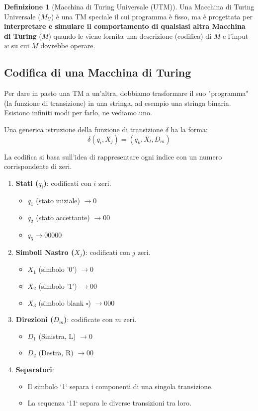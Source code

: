 \documentclass[a4paper]{article}
\theoremstyle{definition} %
\newtheorem{definition}{Definizione}
\newcommand{\blankS}{\ensuremath{\square}}
\theoremstyle{remark} %
\begin{document}
\begin{definition}[Macchina di Turing Universale (UTM)]
Una Macchina di Turing Universale ($M_U$) è una TM speciale il cui programma è fisso, ma è progettata per \textbf{interpretare e simulare il comportamento di qualsiasi altra Macchina di Turing} ($M$) quando le viene fornita una descrizione (codifica) di $M$ e l'input $w$ su cui $M$ dovrebbe operare.
\end{definition}

\subsection{Codifica di una Macchina di Turing}

Per dare in pasto una TM a un'altra, dobbiamo trasformare il suo "programma" (la funzione di transizione) in una stringa, ad esempio una stringa binaria. Esistono infiniti modi per farlo, ne vediamo uno.

Una generica istruzione della funzione di transizione $\delta$ ha la forma:
\[ \delta(q_i, X_j) = (q_k, X_l, D_m) \]

La codifica si basa sull'idea di rappresentare ogni indice con un numero corrispondente di zeri.
\begin{enumerate}
    \item \textbf{Stati ($q_i$)}: codificati con $i$ zeri.
    \begin{itemize}
        \item $q_1$ (stato iniziale) $\rightarrow 0$
        \item $q_2$ (stato accettante) $\rightarrow 00$
        \item $q_5 \rightarrow 00000$
    \end{itemize}
    \item \textbf{Simboli Nastro ($X_j$)}: codificati con $j$ zeri.
    \begin{itemize}
        \item $X_1$ (simbolo '0') $\rightarrow 0$
        \item $X_2$ (simbolo '1') $\rightarrow 00$
        \item $X_3$ (simbolo blank $\blankS$) $\rightarrow 000$
    \end{itemize}
    \item \textbf{Direzioni ($D_m$)}: codificate con $m$ zeri.
    \begin{itemize}
        \item $D_1$ (Sinistra, L) $\rightarrow 0$
        \item $D_2$ (Destra, R) $\rightarrow 00$
    \end{itemize}
    \item \textbf{Separatori}:
    \begin{itemize}
        \item Il simbolo `1` separa i componenti di una singola transizione.
        \item La sequenza `11` separa le diverse transizioni tra loro.
    \end{itemize}
\end{enumerate}
\end{document}
